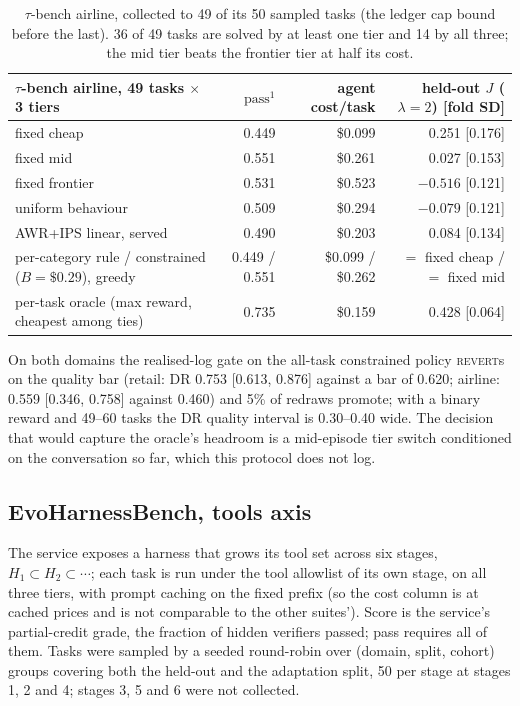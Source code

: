 \documentclass[10pt]{article}
\newcommand{\REVERT}{\textsc{revert}}
\begin{document}
\begin{table}[htbp]\centering\small
\begin{tabular}{lrrr}\toprule
$\tau$-bench airline, 49 tasks $\times$ 3 tiers & $\mathrm{pass}^1$ & agent cost/task & held-out $J$ ($\lambda=2$) [fold SD] \\\midrule
fixed cheap & 0.449 & \$0.099 & 0.251 [0.176] \\
fixed mid & 0.551 & \$0.261 & 0.027 [0.153] \\
fixed frontier & 0.531 & \$0.523 & $-0.516$ [0.121] \\
uniform behaviour & 0.509 & \$0.294 & $-0.079$ [0.121] \\
AWR+IPS linear, served & 0.490 & \$0.203 & 0.084 [0.134] \\
per-category rule / constrained ($B=\$0.29$), greedy & 0.449 / 0.551 & \$0.099 / \$0.262 & $=$ fixed cheap / $=$ fixed mid \\
per-task oracle (max reward, cheapest among ties) & 0.735 & \$0.159 & 0.428 [0.064] \\\bottomrule
\end{tabular}
\caption{$\tau$-bench airline, collected to 49 of its 50 sampled tasks (the ledger cap bound before the last). 36 of 49 tasks are solved by at least one tier and 14 by all three; the mid tier beats the frontier tier at half its cost.}
\label{tab:taubench_air}
\end{table}

On both domains the realised-log gate on the all-task constrained policy \REVERT{}s on the quality bar (retail: DR 0.753 [0.613, 0.876] against a bar of 0.620; airline: 0.559 [0.346, 0.758] against 0.460) and 5\% of redraws promote; with a binary reward and 49--60 tasks the DR quality interval is 0.30--0.40 wide. The decision that would capture the oracle's headroom is a mid-episode tier switch conditioned on the conversation so far, which this protocol does not log.

\subsection{EvoHarnessBench, tools axis}

The service exposes a harness that grows its tool set across six stages, $H_1\subset H_2\subset\cdots$; each task is run under the tool allowlist of its own stage, on all three tiers, with prompt caching on the fixed prefix (so the cost column is at cached prices and is not comparable to the other suites'). Score is the service's partial-credit grade, the fraction of hidden verifiers passed; pass requires all of them. Tasks were sampled by a seeded round-robin over (domain, split, cohort) groups covering both the held-out and the adaptation split, 50 per stage at stages 1, 2 and 4; stages 3, 5 and 6 were not collected.
\end{document}
